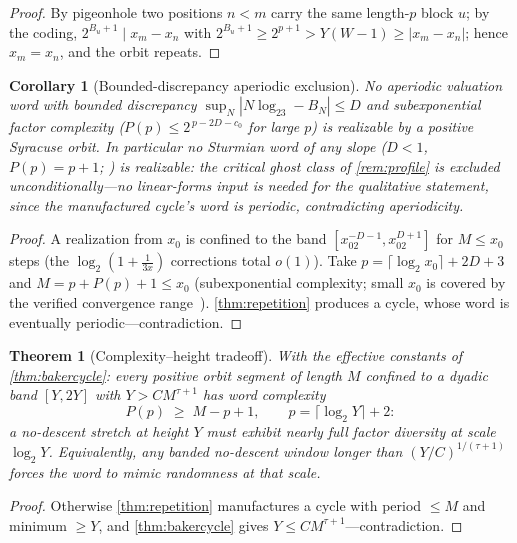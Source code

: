 \documentclass[11pt]{article}
\theoremstyle{plain}
\newtheorem{theorem}{Theorem}
\newtheorem{corollary}{Corollary}
\theoremstyle{definition}
\theoremstyle{remark}
\begin{document}
\begin{proof}
By pigeonhole two positions $n<m$ carry the same length-$p$ block $u$;
by the coding, $2^{B_u+1}\mid x_m-x_n$ with $2^{B_u+1}\ge2^{p+1}>
Y(W-1)\ge|x_m-x_n|$; hence $x_m=x_n$, and the orbit repeats.
\end{proof}

\begin{corollary}[Bounded-discrepancy aperiodic exclusion]
\label{cor:sturmianexcl}
No aperiodic valuation word with bounded discrepancy
$\sup_N|N\log_23-B_N|\le D$ and subexponential factor complexity
($P(p)\le2^{\,p-2D-c_0}$ for large $p$) is realizable by a positive
Syracuse orbit. In particular \emph{no Sturmian word of any slope}
($D<1$, $P(p)=p+1$; \cite{morsehedlund1940,lothaire2002}) is realizable: the critical ghost class of
\cref{rem:profile} is excluded unconditionally---no linear-forms input
is needed for the qualitative statement, since the manufactured cycle's
word is periodic, contradicting aperiodicity.
\end{corollary}

\begin{proof}
A realization from $x_0$ is confined to the band
$[x_02^{-D-1},x_02^{D+1}]$ for $M\le x_0$ steps (the
$\log_2(1+\tfrac1{3x})$ corrections total $o(1)$). Take
$p=\lceil\log_2x_0\rceil+2D+3$ and $M=p+P(p)+1\le x_0$ (subexponential
complexity; small $x_0$ is covered by the verified convergence
range~\cite{barina2021}).
\cref{thm:repetition} produces a cycle, whose word is eventually
periodic---contradiction.
\end{proof}

\begin{theorem}[Complexity--height tradeoff]\label{thm:tradeoff}
With the effective constants of \cref{thm:bakercycle}: every positive
orbit segment of length $M$ confined to a dyadic band $[Y,2Y]$ with
$Y>CM^{\tau+1}$ has word complexity
\[
P(p)\;\ge\;M-p+1,
\qquad p=\lceil\log_2Y\rceil+2 :
\]
a no-descent stretch at height $Y$ must exhibit \emph{nearly full factor
diversity} at scale $\log_2Y$. Equivalently, any banded no-descent
window longer than $(Y/C)^{1/(\tau+1)}$ forces the word to mimic
randomness at that scale.
\end{theorem}

\begin{proof}
Otherwise \cref{thm:repetition} manufactures a cycle with period $\le M$
and minimum $\ge Y$, and \cref{thm:bakercycle} gives
$Y\le CM^{\tau+1}$---contradiction.
\end{proof}
\end{document}
